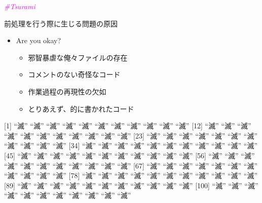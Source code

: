 \documentclass[ignorenonframetext,]{beamer}
\begin{document}
\begin{frame}{\textit{\textcolor{magenta}{\#Tsurami}}}


\end{frame}

\begin{frame}{\faThumbsDown 前処理を行う際に生じる問題の原因}

\begin{itemize}
\itemsep1pt\parskip0pt
\item
  Are you okay?

  \begin{itemize}
  \itemsep1pt\parskip0pt
  \item
    邪智暴虐な俺々ファイルの存在
  \item
    コメントのない奇怪なコード
  \item
    作業過程の再現性の欠如
  \item
    とりあえず、的に書かれたコード
  \end{itemize}
\end{itemize}

\end{frame}

\begin{frame}

{[}1{]} ``滅'' ``滅'' ``滅'' ``滅'' ``滅'' ``滅'' ``滅'' ``滅'' ``滅''
``滅'' ``滅'' {[}12{]} ``滅'' ``滅'' ``滅'' ``滅'' ``滅'' ``滅'' ``滅''
``滅'' ``滅'' ``滅'' ``滅'' {[}23{]} ``滅'' ``滅'' ``滅'' ``滅'' ``滅''
``滅'' ``滅'' ``滅'' ``滅'' ``滅'' ``滅'' {[}34{]} ``滅'' ``滅'' ``滅''
``滅'' ``滅'' ``滅'' ``滅'' ``滅'' ``滅'' ``滅'' ``滅'' {[}45{]} ``滅''
``滅'' ``滅'' ``滅'' ``滅'' ``滅'' ``滅'' ``滅'' ``滅'' ``滅'' ``滅''
{[}56{]} ``滅'' ``滅'' ``滅'' ``滅'' ``滅'' ``滅'' ``滅'' ``滅'' ``滅''
``滅'' ``滅'' {[}67{]} ``滅'' ``滅'' ``滅'' ``滅'' ``滅'' ``滅'' ``滅''
``滅'' ``滅'' ``滅'' ``滅'' {[}78{]} ``滅'' ``滅'' ``滅'' ``滅'' ``滅''
``滅'' ``滅'' ``滅'' ``滅'' ``滅'' ``滅'' {[}89{]} ``滅'' ``滅'' ``滅''
``滅'' ``滅'' ``滅'' ``滅'' ``滅'' ``滅'' ``滅'' ``滅'' {[}100{]} ``滅''
``滅'' ``滅'' ``滅'' ``滅'' ``滅'' ``滅'' ``滅'' ``滅'' ``滅'' ``滅''

\end{frame}
\end{document}

